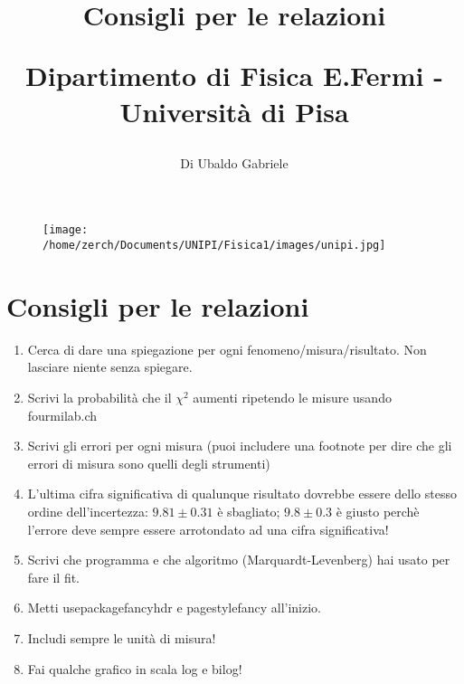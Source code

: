 \documentclass[a4paper,10pt]{article}
\title{Consigli per le relazioni
\begin{large}
Dipartimento di Fisica E.Fermi - Università di Pisa
\end{large}}
\author{Di Ubaldo Gabriele}
\date{}
\begin{document}
\maketitle
\begin {figure}[H]
\begin{center}
\texttt{[image: /home/zerch/Documents/UNIPI/Fisica1/images/unipi.jpg]}
\end{center}
\end{figure}
\section{Consigli per le relazioni}
\begin{enumerate}
 \item Cerca di dare una spiegazione per ogni fenomeno/misura/risultato. Non lasciare niente senza spiegare.
 \item Scrivi la probabilità che il $\chi^2$ aumenti ripetendo le misure usando fourmilab.ch
 \item Scrivi gli errori per ogni misura (puoi includere una footnote per dire che gli errori di misura sono quelli degli strumenti)
 \item L'ultima cifra significativa di qualunque risultato dovrebbe essere dello stesso ordine dell'incertezza: $9.81\pm0.31$ è sbagliato; $9.8\pm0.3$ è giusto perchè l'errore deve sempre essere arrotondato ad una cifra significativa!
 \item Scrivi che programma e che algoritmo (Marquardt-Levenberg) hai usato per fare il fit.
 \item Metti usepackage{fancyhdr}  e pagestyle{fancy} all'inizio.
 \item Includi sempre le unità di misura!
 \item Fai qualche grafico in scala log e bilog!
\end{enumerate}
\end{document}
